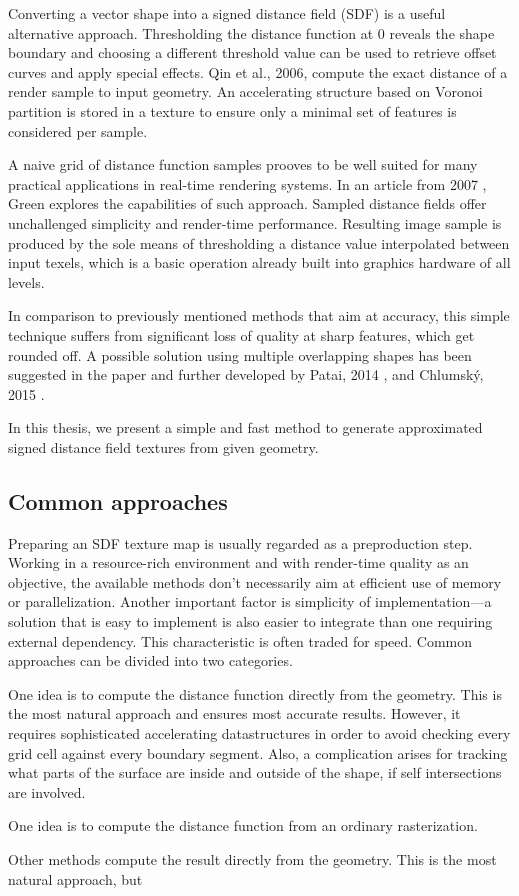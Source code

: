 Converting a vector shape into a signed distance field (SDF) is a useful alternative approach. Thresholding the distance function at 0 reveals the shape boundary and choosing a different threshold value can be used to retrieve offset curves and apply special effects. Qin et al., 2006, \cite{qin06} compute the exact distance of a render sample to input geometry. An accelerating structure based on Voronoi partition is stored in a texture to ensure only a minimal set of features is considered per sample. 

A naive grid of distance function samples prooves to be well suited for many practical applications in real-time rendering systems. In an article from 2007 \cite{green07}, Green explores the capabilities of such approach. Sampled distance fields offer unchallenged simplicity and render-time performance. Resulting image sample is produced by the sole means of thresholding a distance value interpolated between input texels, which is a basic operation already built into graphics hardware of all levels.

In comparison to previously mentioned methods that aim at accuracy, this simple technique suffers from significant loss of quality at sharp features, which get rounded off. A possible solution using multiple overlapping shapes has been suggested in the paper \cite{green07} and further developed by Patai, 2014 \cite{patai14}, and Chlumský, 2015 \cite{chlumsky15}.

In this thesis, we present a simple and fast method to generate approximated signed distance field textures from given geometry.

\subsection{Common approaches}

Preparing an SDF texture map is usually regarded as a preproduction step. Working in a resource-rich environment and with render-time quality as an objective, the available methods don't necessarily aim at efficient use of memory or parallelization. Another important factor is simplicity of implementation---a solution that is easy to implement is also easier to integrate than one requiring external dependency. This characteristic is often traded for speed. Common approaches can be divided into two categories.

One idea is to compute the distance function directly from the geometry. This is the most natural approach and ensures most accurate results. However, it requires sophisticated accelerating datastructures in order to avoid checking every grid cell against every boundary segment. Also, a complication arises for tracking what parts of the surface are inside and outside of the shape, if self intersections are involved.

One idea is to compute the distance function from an ordinary rasterization.

Other methods compute the result directly from the geometry. This is the most natural approach, but 
